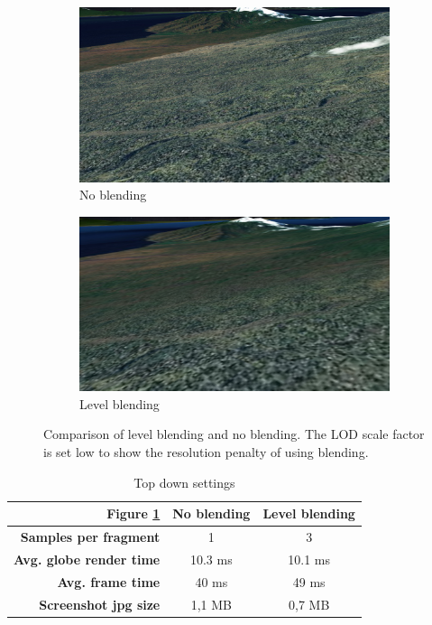 \begin{figure}[h]
    \centering
    \begin{subfigure}[bt]{0.48\textwidth}
        \includegraphics[width=\textwidth]{figures/results/blending/blending_bali_disabled.jpg}
        \caption{No blending}
    \end{subfigure}
    \begin{subfigure}[bt]{0.48\textwidth}
        \includegraphics[width=\textwidth]{figures/results/blending/blending_bali_enabled.jpg}
        \caption{Level blending}
    \end{subfigure}
    \caption{Comparison of level blending and no blending. The LOD scale factor is set low to show the resolution penalty of using blending.}
    \label{fig:blending}
\end{figure}

\begin{table}
\centering
\caption[]{Top down settings}
  \label{table:settingstopdown}
  \begin{tabular}{| r | c c |}
    \hline
      \textbf{Figure \ref{fig:blending}}  & \textbf{No blending} & \textbf{Level blending} \\ \hline
      \textbf{Samples per fragment} & 1 & 3 \\ 
      \textbf{Avg. globe render time}  & 10.3 ms & 10.1 ms \\ 
      \textbf{Avg. frame time}  & 40 ms &  49 ms \\ 
      \textbf{Screenshot jpg size} & 1,1 MB & 0,7 MB \\
    \hline
  \end{tabular}
\end{table}


